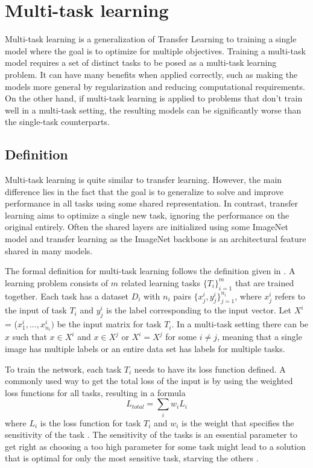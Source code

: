 \chapter{Multi-task learning}
Multi-task learning is a generalization of Transfer Learning to training a single model where the goal is to optimize for multiple objectives.
Training a multi-task model requires a set of distinct tasks to be posed as a multi-task learning problem.
It can have many benefits when applied correctly, such as making the models more general by regularization and reducing computational requirements.
On the other hand, if multi-task learning is applied to problems that don't train well in a multi-task setting, the resulting models can be significantly worse than the single-task counterparts.

\section{Definition}
Multi-task learning is quite similar to transfer learning.
However, the main difference lies in the fact that the goal is to generalize to solve and improve performance in all tasks using some shared representation.
In contrast, transfer learning aims to optimize a single new task, ignoring the performance on the original entirely.
Often the shared layers are initialized using some ImageNet model and transfer learning as the ImageNet backbone is an architectural feature shared in many models.

The formal definition for multi-task learning follows the definition given in \citep{surveyOnMultiTask}.
A learning problem consists of ${m}$ related learning tasks ${\{T_i\}_{i=1}^m}$ that are trained together.
Each task has a dataset ${D_i}$ with ${n_i}$ pairs ${\{x_{j}^{i}, y_{j}^{i}\}_{j=1}^{n_i}}$, where ${x_{j}^{i}}$ refers to the input of task ${T_i}$ and ${y_{j}^{i}}$ is the label corresponding to the input vector.
Let ${X^i}$ = (${x_{1}^{i}, ... , x_{n_i}^{i})}$ be the input matrix for task ${T_i}$.
In a multi-task setting there can be ${x}$ such that ${x \in X^i}$ and ${x \in X^j}$ or ${X^i = X^j}$ for some ${i \ne j}$, meaning that a single image has multiple labels or an entire data set has labels for multiple tasks.

To train the network, each task ${T_i}$ needs to have its loss function defined.
A commonly used way to get the total loss of the input is by using the weighted loss functions for all tasks, resulting in a formula \[L_{total} = \sum_i{w_i L_i}\] \noindent where ${L_i}$ is the loss function for task ${T_i}$ and ${w_i}$ is the weight that specifies the sensitivity of the task \citep{usingUncertaintyToWeighLosses}.
The sensitivity of the tasks is an essential parameter to get right as choosing a too high parameter for some task might lead to a solution that is optimal for only the most sensitive task, starving the others \citep{whichTasks}.

